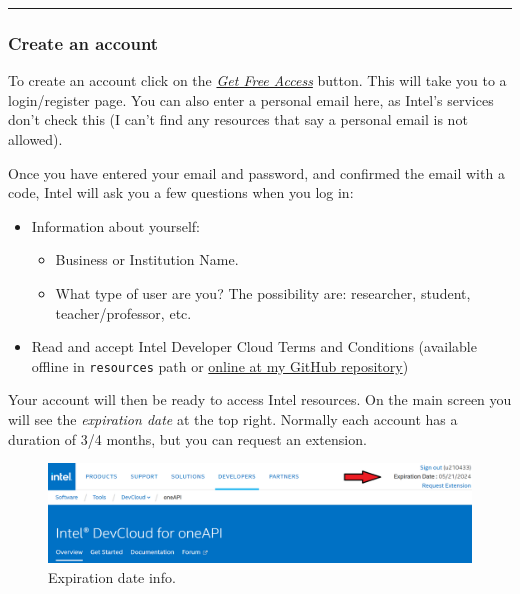 \documentclass[a4paper]{article}
\newcommand{\longline}{\noindent\rule{\textwidth}{0.4pt}}
\begin{document}
    \longline

    \subsubsection{Create an account}\label{subsubsection: build multiarchitecture and FPGA applications - create an account}

    To create an account click on the \href{https://www.intel.com/content/www/us/en/secure/forms/devcloud/enrollment.html}{\emph{Get Free Access}} button. This will take you to a login/register page. You can also enter a personal email here, as Intel's services don't check this (I can't find any resources that say a personal email is not allowed).

    Once you have entered your email and password, and confirmed the email with a code, Intel will ask you a few questions when you log in:
    \begin{itemize}
        \item Information about yourself:
        \begin{itemize}
            \item Business or Institution Name.
            \item What type of user are you? The possibility are: researcher, student, teacher/professor, etc.
        \end{itemize}

        \item Read and accept Intel Developer Cloud Terms and Conditions (available offline in \texttt{resources} path or \href{https://github.com/AndreVale69/FPGA-project-presentation/tree/main/resources/Intel%20Developer%20Cloud%20-%20Terms%20and%20Conditions.pdf}{online at my GitHub repository})
    \end{itemize}
    Your account will then be ready to access Intel resources. On the main screen you will see the \emph{expiration date} at the top right. Normally each account has a duration of 3/4 months, but you can request an extension.
    \begin{figure}[!htp]
        \centering
        \includegraphics[width=\textwidth]{img/expiration_date_intel.png}
        \caption{Expiration date info.}
    \end{figure}\newpage
\end{document}
